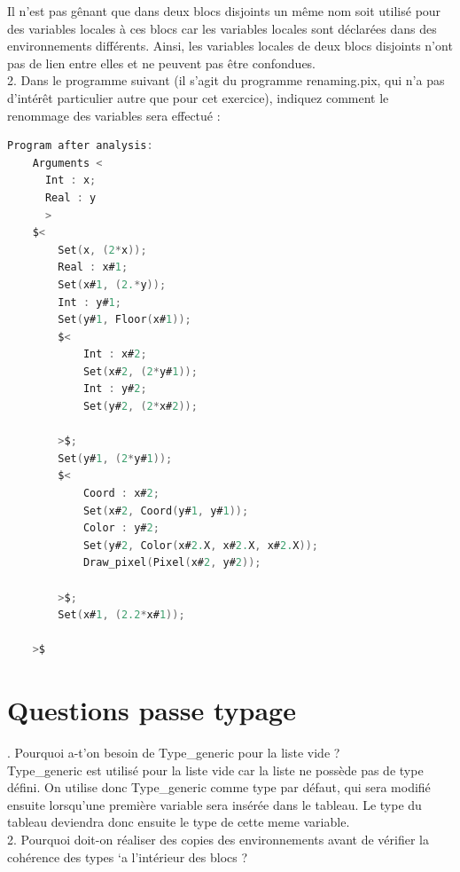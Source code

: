 \documentclass{report}
\begin{document}
    \quad Il n'est pas gênant que dans deux blocs disjoints un même nom soit utilisé pour des variables locales à ces blocs car les variables locales sont déclarées dans des environnements différents. Ainsi, les variables locales de deux blocs disjoints n'ont pas de lien entre elles et ne peuvent pas être confondues.\\

    2. Dans le programme suivant (il s'agit du programme renaming.pix, qui n'a pas d'intérêt particulier autre que pour cet exercice), indiquez comment le renommage des variables sera effectué :\\
    
    \begin{lstlisting}[language=C, basicstyle=\ttfamily]
    Program after analysis:
    Arguments <
      Int : x;
      Real : y
      >
    $<
        Set(x, (2*x));
        Real : x#1;
        Set(x#1, (2.*y));
        Int : y#1;
        Set(y#1, Floor(x#1));
        $<
            Int : x#2;
            Set(x#2, (2*y#1));
            Int : y#2;
            Set(y#2, (2*x#2));
            
        >$;
        Set(y#1, (2*y#1));
        $<
            Coord : x#2;
            Set(x#2, Coord(y#1, y#1));
            Color : y#2;
            Set(y#2, Color(x#2.X, x#2.X, x#2.X));
            Draw_pixel(Pixel(x#2, y#2));
            
        >$;
        Set(x#1, (2.2*x#1));
        
    >$
    \end{lstlisting}

    \newpage


    \section{Questions passe typage}

    . Pourquoi a-t'on besoin de Type\_generic pour la liste vide ?\\

    \quad Type\_generic est utilisé pour la liste vide car la liste ne possède pas de type défini. On utilise donc Type\_generic comme type par défaut, qui sera modifié ensuite lorsqu'une première variable sera insérée dans le tableau. Le type du tableau deviendra donc ensuite le type de cette meme variable.\\

    2. Pourquoi doit-on réaliser des copies des environnements avant de vérifier la cohérence
        des types `a l'intérieur des blocs ?\\
\end{document}
